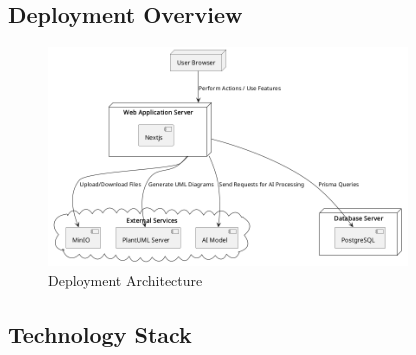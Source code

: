 \subsection{Deployment Overview}

\begin{figure}[H]
    \centering
    \includegraphics[width=0.85\textwidth]{./conception/deployement_diagram.png}
    \caption{Deployment Architecture}
    \label{fig:deployment}
\end{figure}

\subsection{Technology Stack}

